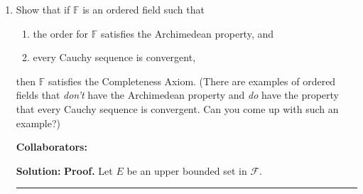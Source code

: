 \documentclass{article}%
\newenvironment{proof}[1][Proof]{\textbf{#1.} }{\ \rule{0.5em}{0.5em}}
\begin{document}
\begin{enumerate}
\bigskip
\textbf{Collaborators:}\\
\smallskip
 
\textbf{Solution:}
\begin{proof}
Let $E$ be a upper-bounded set, and $T$ be the set of all upper bounds of $E$. Construct a function f like this: 
$$
f = \left\{
\begin{aligned} 
1, x\in E \\
-1, x \in T
\end{aligned}
\right.
$$
We assume that $E$ has no supremum. That means $\forall x\in E, \forall \epsilon > 0$(We may assume $x$ is a inner point of $E$), we can find $x_1 > x \in E$, so $\forall x_2 \in (x-\delta, x_1), |f(x_1)-f(x)| = 0 < \epsilon$. So $f$ is continuous on $x$. With the arbitrariness of $x$, $f$ is continuous on $E$. Similarly, $f$ is continuous on $T$. Now we prove that $f$ is continuous on $E\bigcup T$. If not, assume $f$ is not continuous on $x_0$. If $x_0 \in E$, then $f$ should be discontinuous on the right side, which means $\exists \epsilon > 0, \forall \eta > 0, \exists x$, s.t. $|x_0 - x| < \eta, |f(x_0)-f(x)|>\epsilon$. That just means $x_0$ is the supremum of $E$, which makes a contradiction. If $x_0 \in T$, similarly $x_0$ is the supremum of $E$ according to definition. So $f$ is continuous on $E\bigcup T$. Using the property in the problem, for $a \in E, b\in T$, there must exist $x$, s.t. $f(x) = 0$. It contradicts with the construction of $f$. So E has a supremum, which means $\mathcal{F}$ has the least upper bound property.
\end{proof}
\bigskip


\item Show that if $\mathbb{F}$ is an ordered field such that
\begin{enumerate}
\item the order for $\mathbb{F}$ satisfies the Archimedean property, and
\item every Cauchy sequence is convergent, 
\end{enumerate}
then $\mathbb{F}$ satisfies the Completeness Axiom. (There are examples of ordered fields that \emph{don't} have the Archimedean property and \emph{do} have the property that every Cauchy sequence is convergent.  Can you come up with such an example?)


\bigskip
\textbf{Collaborators:}\\
\smallskip
 
\textbf{Solution:}
\begin{proof}
Let $E$ be an upper bounded set in $\mathcal{F}$. 
\end{proof}
\bigskip



\end{enumerate}
\end{document}
